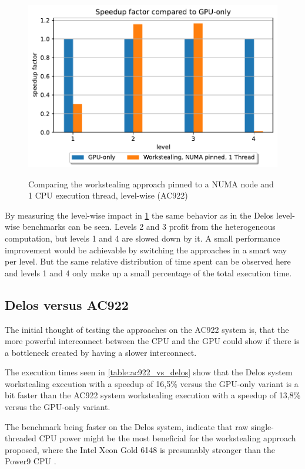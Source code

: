 \begin{figure}[H]
  \caption{Comparing the workstealing approach pinned to a NUMA node and 1 CPU execution thread, level-wise (AC922)}
  \includegraphics[width=\textwidth]{figures/ac922_levelwise.pdf}
  \centering
  \label{fig:levelwise_ac922}
\end{figure}

By measuring the level-wise impact in \ref{fig:levelwise_ac922} the same behavior as in the Delos level-wise benchmarks can be seen. Levels 2 and 3 profit from the heterogeneous computation, but levels 1 and 4 are slowed down by it. A small performance improvement would be achievable by switching the approaches in a smart way per level. But the same relative distribution of time spent can be observed here and levels 1 and 4 only make up a small percentage of the total execution time.

\subsection{Delos versus AC922}
The initial thought of testing the approaches on the AC922 system is, that the more powerful interconnect between the CPU and the GPU could show if there is a bottleneck created by having a slower interconnect.



The execution times seen in \ref{table:ac922_vs_delos} show that the Delos system workstealing execution with a speedup of 16,5\% versus the GPU-only variant is a bit faster than the AC922 system workstealing execution with a speedup of 13,8\% versus the GPU-only variant.

The benchmark being faster on the Delos system, indicate that raw single-threaded CPU power might be the most beneficial for the workstealing approach proposed, where the Intel Xeon Gold 6148 is presumably stronger than the Power9 CPU \cite{POWER9BenchmarksVs}.

